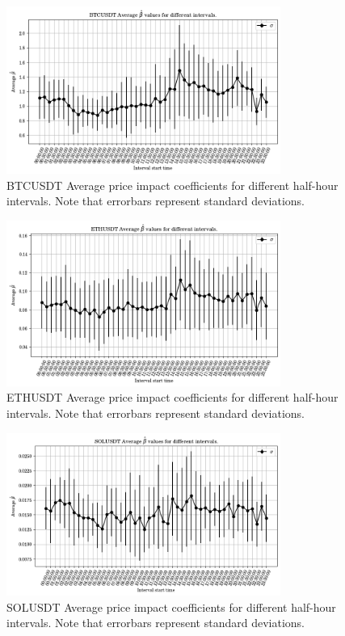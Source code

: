 \documentclass[a4paper, oneside, notitlepage]{book}
\begin{document}
\begin{figure}[htpb]
    \centering
    \includegraphics[width=0.8\textwidth]{./images/BTCUSDT_beta_across_time.png}
    \caption{BTCUSDT Average price impact coefficients for different half-hour intervals. Note that errorbars represent standard deviations.}
    \label{fig:BTCUSDT_beta_across_time}
\end{figure}


\begin{figure}[htpb]
    \centering
    \includegraphics[width=0.8\textwidth]{./images/ETHUSDT_beta_across_time.png}
    \caption{ETHUSDT Average price impact coefficients for different half-hour intervals. Note that errorbars represent standard deviations.}
\end{figure}

\begin{figure}[htpb]
    \centering
    \includegraphics[width=0.8\textwidth]{./images/SOLUSDT_beta_across_time.png}
    \caption{SOLUSDT Average price impact coefficients for different half-hour intervals. Note that errorbars represent standard deviations.}
\end{figure}
\end{document}
